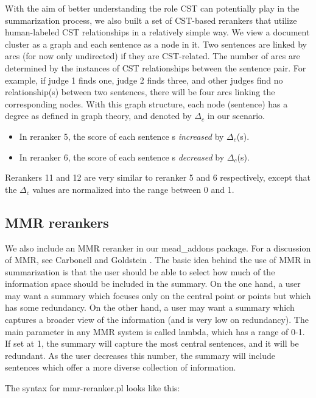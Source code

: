 \documentclass[10pt]{article}
\begin{document}
With the aim of better understanding the role CST can potentially
play in the summarization process, we also built a set of
CST-based rerankers that utilize human-labeled CST relationships
in a relatively simple way. We view a document cluster as a graph
and each sentence as a node in it. Two sentences are linked by
arcs (for now only undirected) if they are CST-related. The number
of arcs are determined by the instances of CST relationships
between the sentence pair. For example, if  judge 1 finds one,
judge 2 finds three,  and other judges find no relationship(s)
between two sentences, there will be four arcs linking the
corresponding nodes. With this graph structure, each node
(sentence) has a degree as defined in graph theory, and denoted by
$\Delta_c$ in our scenario.

\begin{itemize}
\item In reranker 5, the score of each sentence s {\em increased} by
$\Delta_c$(s).
\item In reranker 6, the score of each sentence s {\em decreased} by
$\Delta_c$(s).
\end{itemize}

Rerankers 11 and 12 are very similar to reranker 5 and 6
respectively, except that the $\Delta_c$ values are normalized
into the range between 0 and 1.

\subsection{MMR rerankers}
We also include an MMR reranker in our mead\_addons package.  
For a discussion of MMR, see Carbonell and Goldstein \cite{Carbonell&Goldstein98}.  
The basic idea behind the use of MMR in summarization is that the user 
should be able to select how much of the information space should be 
included in the summary.  On the one hand, a user may want a summary which 
focuses only on the central point or points but which has some redundancy.  
On the other hand, a user may want a summary which captures a broader 
view of the information (and is very low on redundancy).  The main 
parameter in any MMR system is called lambda, which has a range of 0-1.  
If set at 1, the summary will capture the most central sentences, and it 
will be redundant.  As the user decreases this number, the summary 
will include sentences which offer a more diverse collection of information.

The syntax for mmr-reranker.pl looks like this:
\end{document}
